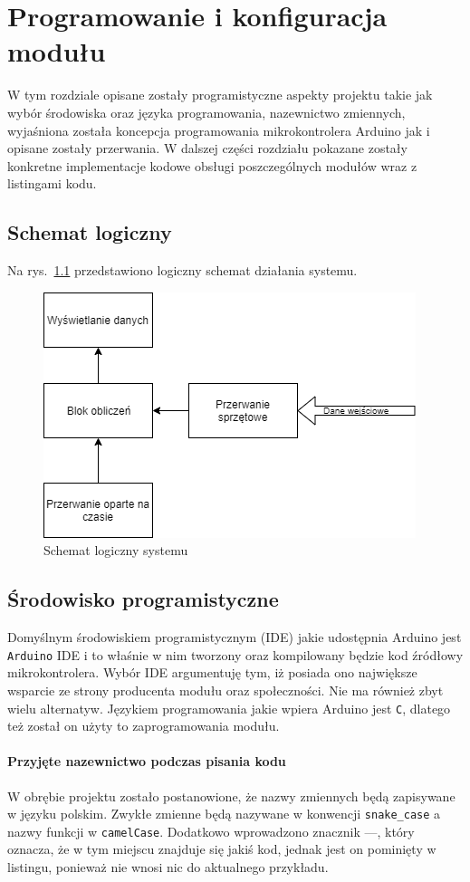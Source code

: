 \chapter{Programowanie i konfiguracja modułu}
W tym rozdziale opisane zostały programistyczne aspekty projektu takie jak wybór środowiska oraz języka programowania, nazewnictwo zmiennych, wyjaśniona została koncepcja programowania mikrokontrolera Arduino jak i opisane zostały przerwania. W dalszej części rozdziału pokazane zostały konkretne implementacje kodowe obsługi poszczególnych modułów wraz z listingami kodu.

\section{Schemat logiczny}
Na rys.~\ref{fig:schemat} przedstawiono logiczny schemat działania systemu.

\begin{figure}[!htb]
\centering
\includegraphics[width=0.7\linewidth]{Rysunki/schemat_logiczny.png}
\caption{Schemat logiczny systemu}
\label{fig:schemat}
\end{figure}

\section{Środowisko programistyczne}

Domyślnym środowiskiem programistycznym (IDE) jakie udostępnia Arduino jest \texttt{Arduino} IDE i to właśnie w nim tworzony oraz kompilowany będzie kod źródłowy mikrokontrolera. Wybór IDE argumentuję tym, iż posiada ono największe wsparcie ze strony producenta modułu oraz społeczności. Nie ma również zbyt wielu alternatyw. Językiem programowania jakie wpiera Arduino jest \texttt{C}, dlatego też został on użyty to zaprogramowania modułu.

\subsubsection{Przyjęte nazewnictwo podczas pisania kodu}
W obrębie projektu zostało postanowione, że nazwy zmiennych będą zapisywane w języku polskim. Zwykłe zmienne będą nazywane w konwencji \texttt{snake\_case} a nazwy funkcji w \texttt{camelCase}. Dodatkowo wprowadzono znacznik ---, który oznacza, że w tym miejscu znajduje się jakiś kod, jednak jest on pominięty w listingu, ponieważ nie wnosi nic do aktualnego przykładu.

